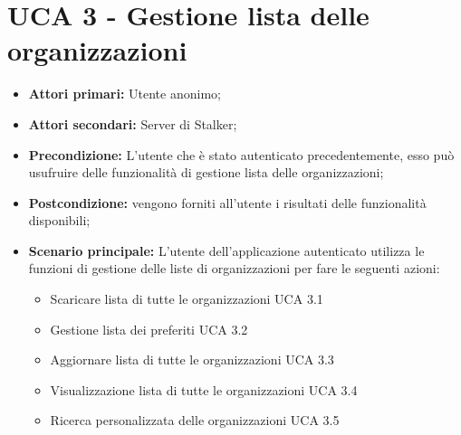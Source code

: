 \section{UCA 3 - Gestione lista delle organizzazioni}%
\begin{itemize}
\item \textbf{Attori primari:} Utente anonimo;
\item \textbf{Attori secondari:} Server di Stalker;
\item \textbf{Precondizione:} L’utente che è stato autenticato precedentemente, esso può usufruire delle funzionalità di gestione lista delle organizzazioni;
\item \textbf{Postcondizione:} vengono forniti all’utente i risultati delle funzionalità disponibili;
\item \textbf{Scenario principale:} L’utente dell’applicazione autenticato utilizza le funzioni di gestione delle liste di organizzazioni per fare le seguenti azioni:
	\begin{itemize}
		\item Scaricare lista di tutte le organizzazioni UCA 3.1
		\item Gestione lista dei preferiti UCA 3.2
		\item Aggiornare lista di tutte le organizzazioni UCA 3.3
		\item Visualizzazione lista di tutte le organizzazioni UCA 3.4
		\item Ricerca personalizzata delle organizzazioni UCA 3.5
	\end{itemize}
\end{itemize}

